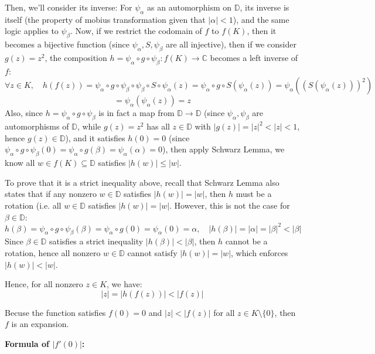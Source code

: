 \documentclass{article}
\begin{document}
\begin{itemize}
    Then, we'll consider its inverse: 
    For $\psi_\alpha$ as an automorphism on $\mathbb{D}$, its inverse is itself (the property of mobius transformation given that $|\alpha|<1$), and the same logic applies to $\psi_\beta$.
    Now, if we restrict the codomain of $f$ to $f(K)$, then it becomes a bijective function (since $\psi_\alpha, S,\psi_\beta$ are all injective), then if we consider $g(z)=z^2$,
    the composition $h=\psi_\alpha\circ g\circ\psi_\beta:f(K)\rightarrow \mathbb{C}$ becomes a left inverse of $f$:
    $$\forall z\in K,\quad h(f(z))=\psi_\alpha\circ g\circ\psi_\beta\circ\psi_\beta\circ S\circ \psi_\alpha(z) = \psi_\alpha\circ g\circ S(\psi_\alpha(z)) = \psi_\alpha((S(\psi_\alpha(z)))^2)$$
    $$ = \psi_\alpha(\psi_\alpha(z))=z$$
    Also, since $h=\psi_\alpha\circ g\circ \psi_\beta$ is in fact a map from $\mathbb{D}\rightarrow\mathbb{D}$ (since $\psi_\alpha,\psi_\beta$ are automorphisms of $\mathbb{D}$, while $g(z)=z^2$ has all $z\in\mathbb{D}$ with $|g(z)|=|z|^2<|z|<1$, hence $g(z)\in\mathbb{D}$),
    and it satisfies $h(0)=0$ (since $\psi_\alpha\circ g\circ \psi_\beta(0)=\psi_\alpha\circ g(\beta)=\psi_\alpha(\alpha)=0$),
    then apply Schwarz Lemma, we know all $w\in f(K)\subseteq\mathbb{D}$ satisfies $|h(w)|\leq |w|$. 

    To prove that it is a strict inequality above, recall that Schwarz Lemma also states that if any nonzero $w\in\mathbb{D}$ satisfies $|h(w)|=|w|$, then $h$ must be a rotation (i.e. all $w\in\mathbb{D}$ satisfies $|h(w)|=|w|$. However, this is not the case for $\beta\in\mathbb{D}$:
    $$h(\beta)=\psi_\alpha\circ g\circ\psi_{\beta}(\beta) = \psi_\alpha\circ g(0)=\psi_\alpha(0)=\alpha,\quad |h(\beta)|=|\alpha|=|\beta|^2 < |\beta|$$
    Since $\beta\in\mathbb{D}$ satisfies a strict inequality $|h(\beta)|<|\beta|$, then $h$ cannot be a rotation, hence all nonzero $w\in\mathbb{D}$ cannot satisfy $|h(w)|=|w|$, which enforces $|h(w)|<|w|$.

    Hence, for all nonzero $z\in K$, we have:
    $$|z|=|h(f(z))|< |f(z)|$$

    Becuse the function satisfies $f(0)=0$ and $|z|< |f(z)|$ for all $z\in K\setminus\{0\}$, then $f$ is an expansion.

    \textbf{Formula of $|f'(0)|$:}


\end{itemize}
\end{document}
